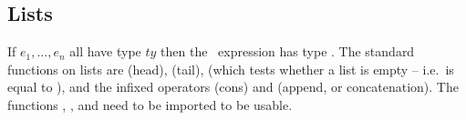 \documentclass[11pt]{article}
\begin{document}



\subsection {Lists}
\label{sec:lists}

If $e_1,\ldots,e_n$ all have type $ty$ then the \ML\ expression
\TTD{[$e_1$;$\ldots$;$e_n$]} has type .  The standard
functions on lists are  (head),
 (tail),  (which
tests whether a list is empty -- i.e.\ is equal to \TTD{[]}), and the infixed
operators  (cons)
and \TTD{++} (append,
or concatenation).  The functions , , and 
need to be imported to be usable.
\end{document}

